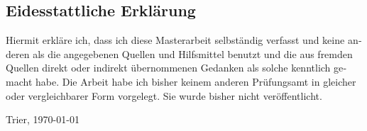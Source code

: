 \begin{otherlanguage}{ngerman}

	\chapter*{Eidesstattliche Erklärung}

	Hiermit erkläre ich, dass ich diese Masterarbeit selbständig verfasst und keine anderen als die angegebenen Quellen und Hilfsmittel benutzt und die aus fremden Quellen direkt oder indirekt übernommenen Gedanken als solche kenntlich gemacht habe.
	Die Arbeit habe ich bisher keinem anderen Prüfungsamt in gleicher oder vergleichbarer Form vorgelegt.
	Sie wurde bisher nicht veröffentlicht.

	\bigskip

	\noindent
	Trier, \today


\end{otherlanguage}
